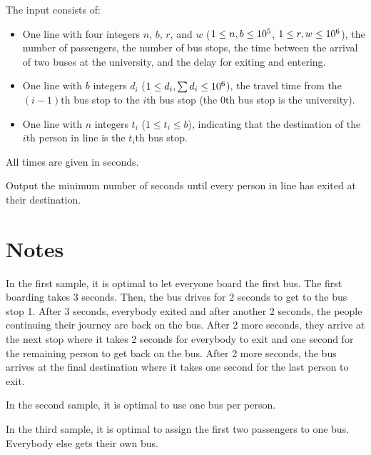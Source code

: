 \begin{Input}
    The input consists of:
    \begin{itemize}
      \item One line with four integers $n$, $b$, $r$, and $w$ ($1\leq n, b \leq 10^5$, $1\leq r, w \leq 10^6$), the number of passengers, the number of bus stops, the time between the arrival of two buses at the university, and the delay for exiting and entering.
      \item One line with \(b\) integers \(d_{i}\) (\(1 \le d_{i}, \sum d_{i} \leq 10^6\)), the travel time from the \((i-1)\)th bus stop to the \(i\)th bus stop (the \(0\)th bus stop is the university).
      \item One line with \(n\) integers \(t_{i}\) (\(1 \leq t_{i} \leq b\)), indicating that the destination of the \(i\)th person in line is the $t_i$th bus stop.
    \end{itemize}
    All times are given in seconds.
\end{Input}

\begin{Output}
  Output the minimum number of seconds until every person in line has exited at their destination.
\end{Output}

\section*{Notes}
In the first sample, it is optimal to let everyone board the first bus.
The first boarding takes 3 seconds.
Then, the bus drives for 2 seconds to get to the bus stop 1.
After 3 seconds, everybody exited and after another 2 seconds, the people continuing their journey are back on the bus.
After 2 more seconds, they arrive at the next stop where it takes 2 seconds for everybody to exit and one second for the remaining person to get back on the bus.
After 2 more seconds, the bus arrives at the final destination where it takes one second for the last person to exit.

In the second sample, it is optimal to use one bus per person.

In the third sample, it is optimal to assign the first two passengers to one bus.
Everybody else gets their own bus.
